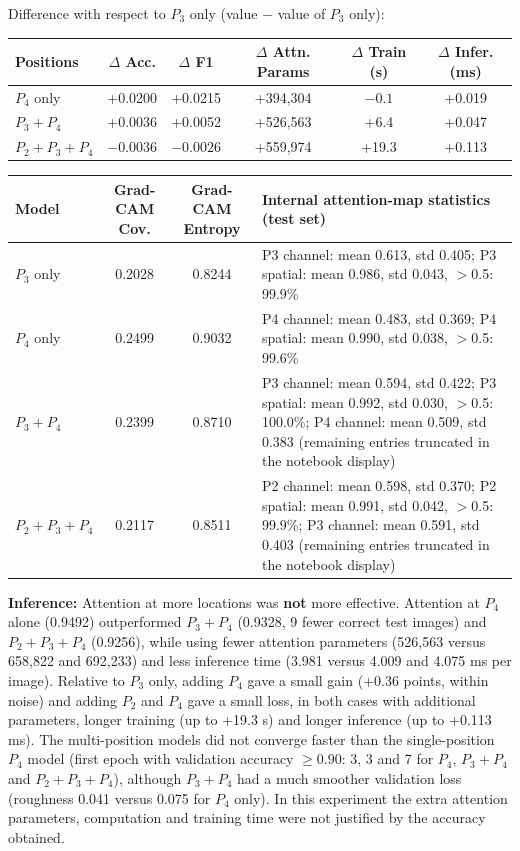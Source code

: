 \documentclass[10pt]{article}
\begin{document}
Difference with respect to $P_3$ only (value $-$ value of $P_3$ only):

\begin{center}
\begin{tabular}{|l|c|c|c|c|c|}
\hline
\textbf{Positions} & \textbf{$\Delta$ Acc.} & \textbf{$\Delta$ F1} & \textbf{$\Delta$ Attn. Params} & \textbf{$\Delta$ Train (s)} & \textbf{$\Delta$ Infer. (ms)} \\
\hline
$P_4$ only & +0.0200 & +0.0215 & +394{,}304 & $-0.1$ & +0.019 \\
\hline
$P_3+P_4$ & +0.0036 & +0.0052 & +526{,}563 & +6.4 & +0.047 \\
\hline
$P_2+P_3+P_4$ & $-0.0036$ & $-0.0026$ & +559{,}974 & +19.3 & +0.113 \\
\hline
\end{tabular}
\end{center}

\begin{center}
\small
\begin{tabular}{|l|c|c|p{9.2cm}|}
\hline
\textbf{Model} & \textbf{Grad-CAM Cov.} & \textbf{Grad-CAM Entropy} & \textbf{Internal attention-map statistics (test set)} \\
\hline
$P_3$ only & 0.2028 & 0.8244 & P3 channel: mean 0.613, std 0.405; P3 spatial: mean 0.986, std 0.043, $>$0.5: 99.9\% \\
\hline
$P_4$ only & 0.2499 & 0.9032 & P4 channel: mean 0.483, std 0.369; P4 spatial: mean 0.990, std 0.038, $>$0.5: 99.6\% \\
\hline
$P_3+P_4$ & 0.2399 & 0.8710 & P3 channel: mean 0.594, std 0.422; P3 spatial: mean 0.992, std 0.030, $>$0.5: 100.0\%; P4 channel: mean 0.509, std 0.383 (remaining entries truncated in the notebook display) \\
\hline
$P_2+P_3+P_4$ & 0.2117 & 0.8511 & P2 channel: mean 0.598, std 0.370; P2 spatial: mean 0.991, std 0.042, $>$0.5: 99.9\%; P3 channel: mean 0.591, std 0.403 (remaining entries truncated in the notebook display) \\
\hline
\end{tabular}
\end{center}

\textbf{Inference:} Attention at more locations was \textbf{not} more effective. Attention at $P_4$ alone (0.9492) outperformed $P_3+P_4$ (0.9328, 9 fewer correct test images)
and $P_2+P_3+P_4$ (0.9256), while using fewer attention parameters (526{,}563 versus 658{,}822 and 692{,}233) and less inference time (3.981 versus 4.009 and 4.075 ms per image).
Relative to $P_3$ only, adding $P_4$ gave a small gain (+0.36 points, within noise) and adding $P_2$ and $P_4$ gave a small loss, in both cases with additional parameters, longer training
(up to +19.3 s) and longer inference (up to +0.113 ms). The multi-position models did not converge faster than the single-position $P_4$ model (first epoch with validation accuracy $\ge0.90$: 3, 3 and 7 for
$P_4$, $P_3+P_4$ and $P_2+P_3+P_4$), although $P_3+P_4$ had a much smoother validation loss (roughness 0.041 versus 0.075 for $P_4$ only). In this experiment the extra attention parameters, computation
and training time were not justified by the accuracy obtained.
\end{document}
